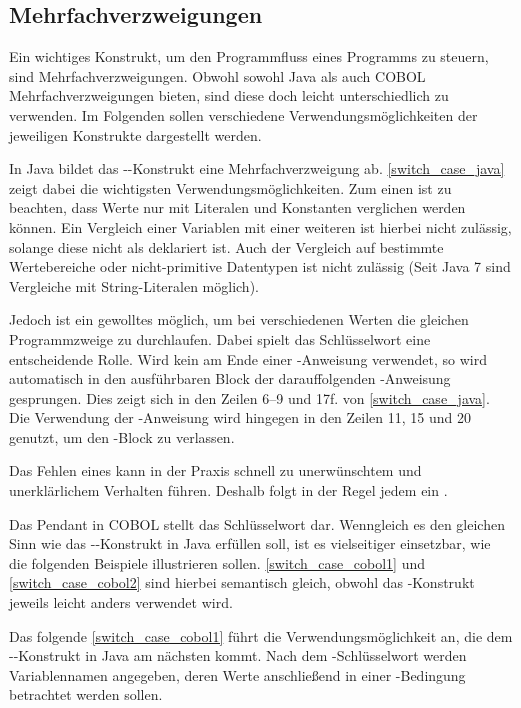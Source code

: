 \subsection{Mehrfachverzweigungen}
Ein wichtiges Konstrukt, um den Programmfluss eines Programms zu steuern, sind Mehrfachverzweigungen. Obwohl sowohl Java als auch COBOL Mehrfachverzweigungen bieten, sind diese doch leicht unterschiedlich zu verwenden. Im Folgenden sollen verschiedene Verwendungsmöglichkeiten der jeweiligen Konstrukte dargestellt werden.

In Java bildet das --Konstrukt eine Mehrfachverzweigung ab. \autoref{switch_case_java} zeigt dabei die wichtigsten Verwendungsmöglichkeiten.
Zum einen ist zu beachten, dass Werte nur mit Literalen und Konstanten verglichen werden können. Ein Vergleich einer Variablen mit einer weiteren ist hierbei nicht zulässig, solange diese nicht als  deklariert ist. Auch der Vergleich auf bestimmte Wertebereiche oder nicht-primitive Datentypen ist nicht zulässig (Seit Java 7 sind Vergleiche mit String-Literalen möglich).

Jedoch ist ein gewolltes  möglich, um bei verschiedenen Werten die gleichen Programmzweige zu durchlaufen. Dabei spielt das Schlüsselwort  eine entscheidende Rolle. Wird kein  am Ende einer -Anweisung verwendet, so wird automatisch in den ausführbaren Block der darauffolgenden -Anweisung gesprungen. Dies zeigt sich in den Zeilen 6--9 und 17f. von \autoref{switch_case_java}. Die Verwendung der -Anweisung wird hingegen in den Zeilen 11, 15 und 20 genutzt, um den -Block zu verlassen.
 
Das Fehlen eines  kann in der Praxis schnell zu unerwünschtem und unerklärlichem Verhalten führen. Deshalb folgt in der Regel jedem  ein . 

Das Pendant in COBOL stellt das Schlüsselwort  dar. Wenngleich es den gleichen Sinn wie das --Konstrukt in Java erfüllen soll, ist es vielseitiger einsetzbar, wie die folgenden Beispiele illustrieren sollen. \autoref{switch_case_cobol1} und \autoref{switch_case_cobol2} sind hierbei semantisch gleich, obwohl das -Konstrukt jeweils leicht anders verwendet wird.

Das folgende \autoref{switch_case_cobol1} führt die Verwendungsmöglichkeit an, die dem --Konstrukt in Java am nächsten kommt. Nach dem -Schlüsselwort werden Variablennamen angegeben, deren Werte anschließend in einer -Bedingung betrachtet werden sollen.

